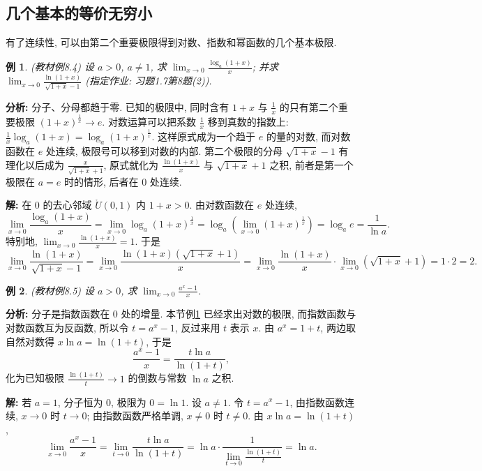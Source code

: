 \documentclass[UTF8,openany]{ctexbook}
\theoremstyle{chinesetextbook}
\newtheorem{example}{例}[section]
\newenvironment{cnsolution}{\par\indent\textbf{解:} \ignorespaces}{\par}
\begin{document}
\subsection{几个基本的等价无穷小}
有了连续性, 可以由第二个重要极限得到对数、指数和幂函数的几个基本极限.
\begin{example}\label{ex:8-4}
\textnormal{(教材例8.4)} 设 $a>0$, $a\ne1$, 求 $\displaystyle\lim_{x\to0}\frac{\log_a(1+x)}x$; 并求 $\displaystyle\lim_{x\to0}\frac{\ln(1+x)}{\sqrt{1+x}-1}$ (指定作业: 习题1.7第8题(2)).
\end{example}
\par\indent\textbf{分析:} 分子、分母都趋于零. 已知的极限中, 同时含有 $1+x$ 与 $\displaystyle\frac1x$ 的只有第二个重要极限 $(1+x)^{\frac1x}\to e$. 对数运算可以把系数 $\displaystyle\frac1x$ 移到真数的指数上: $\displaystyle\frac1x\log_a(1+x)=\log_a(1+x)^{\frac1x}$. 这样原式成为一个趋于 $e$ 的量的对数, 而对数函数在 $e$ 处连续, 极限号可以移到对数的内部. 第二个极限的分母 $\sqrt{1+x}-1$ 有理化以后成为 $\displaystyle\frac x{\sqrt{1+x}+1}$, 原式就化为 $\displaystyle\frac{\ln(1+x)}x$ 与 $\sqrt{1+x}+1$ 之积, 前者是第一个极限在 $a=e$ 时的情形, 后者在 $0$ 处连续.
\begin{cnsolution}
在 $0$ 的去心邻域 $\mathring U(0,1)$ 内 $1+x>0$. 由对数函数在 $e$ 处连续,
\[
\lim_{x\to0}\frac{\log_a(1+x)}x=\lim_{x\to0}\log_a(1+x)^{\frac1x}=\log_a\left(\lim_{x\to0}(1+x)^{\frac1x}\right)=\log_ae=\frac1{\ln a}.
\]
特别地, $\displaystyle\lim_{x\to0}\frac{\ln(1+x)}x=1$. 于是
\[
\lim_{x\to0}\frac{\ln(1+x)}{\sqrt{1+x}-1}=\lim_{x\to0}\frac{\ln(1+x)\left(\sqrt{1+x}+1\right)}x=\lim_{x\to0}\frac{\ln(1+x)}x\cdot\lim_{x\to0}\left(\sqrt{1+x}+1\right)=1\cdot2=2.
\]
\end{cnsolution}
\begin{example}\label{ex:8-5}
\textnormal{(教材例8.5)} 设 $a>0$, 求 $\displaystyle\lim_{x\to0}\frac{a^x-1}x$.
\end{example}
\par\indent\textbf{分析:} 分子是指数函数在 $0$ 处的增量. 本节例\ref{ex:8-4} 已经求出对数的极限, 而指数函数与对数函数互为反函数, 所以令 $t=a^x-1$, 反过来用 $t$ 表示 $x$. 由 $a^x=1+t$, 两边取自然对数得 $x\ln a=\ln(1+t)$, 于是
\[
\frac{a^x-1}x=\frac{t\ln a}{\ln(1+t)},
\]
化为已知极限 $\displaystyle\frac{\ln(1+t)}t\to1$ 的倒数与常数 $\ln a$ 之积.
\begin{cnsolution}
若 $a=1$, 分子恒为 $0$, 极限为 $0=\ln1$. 设 $a\ne1$. 令 $t=a^x-1$, 由指数函数连续, $x\to0$ 时 $t\to0$; 由指数函数严格单调, $x\ne0$ 时 $t\ne0$. 由 $x\ln a=\ln(1+t)$,
\[
\lim_{x\to0}\frac{a^x-1}x=\lim_{t\to0}\frac{t\ln a}{\ln(1+t)}=\ln a\cdot\frac1{\displaystyle\lim_{t\to0}\frac{\ln(1+t)}t}=\ln a.
\]
\end{cnsolution}
\end{document}
